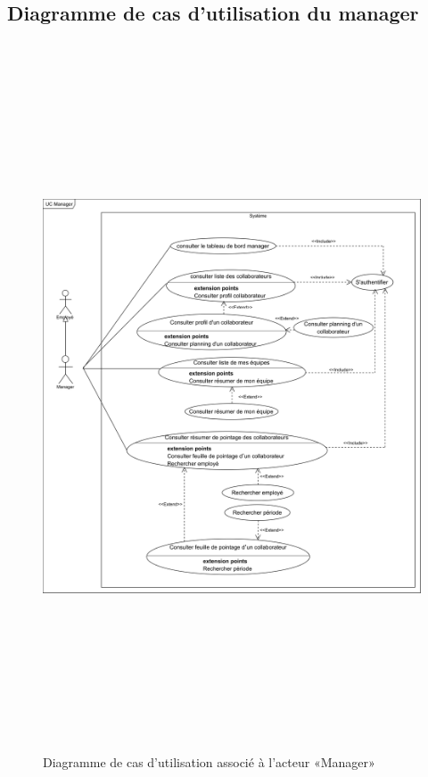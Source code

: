     \subsection{Diagramme de cas d'utilisation du manager}
        \begin{figure}[h!]
            \centering
            \includegraphics[width=16cm,height=21cm]{images/uc_manager.png}
            \caption{Diagramme de cas d'utilisation associé à l'acteur «Manager»}
            \label{fig3}
        \end{figure}
    
    \clearpage  
     
